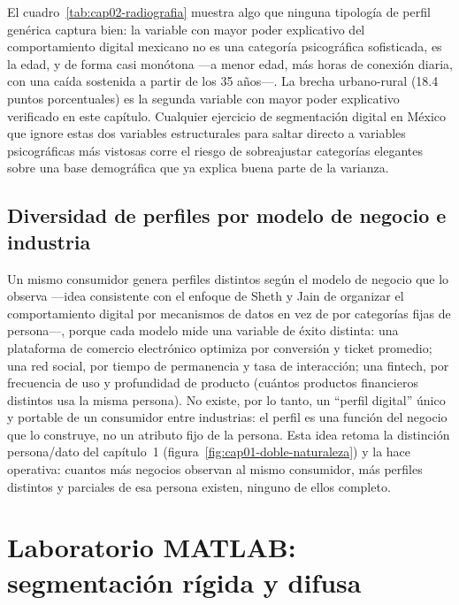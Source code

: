 El cuadro~\ref{tab:cap02-radiografia} muestra algo que ninguna tipología de
perfil genérica captura bien: la variable con mayor poder explicativo del
comportamiento digital mexicano no es una categoría psicográfica sofisticada,
es la edad, y de forma casi monótona —a menor edad, más horas de conexión
diaria, con una caída sostenida a partir de los 35 años—. La brecha
urbano-rural (18.4 puntos porcentuales) es la segunda variable con mayor
poder explicativo verificado en este capítulo. Cualquier ejercicio de
segmentación digital en México que ignore estas dos variables estructurales
para saltar directo a variables psicográficas más vistosas corre el riesgo
de sobreajustar categorías elegantes sobre una base demográfica que ya
explica buena parte de la varianza.

\subsection{Diversidad de perfiles por modelo de negocio e industria}

Un mismo consumidor genera perfiles distintos según el modelo de negocio que
lo observa —idea consistente con el enfoque de Sheth y Jain
\parencite{sheth2026} de organizar el comportamiento digital por mecanismos
de datos en vez de por categorías fijas de persona—, porque cada modelo mide
una variable de éxito distinta: una
plataforma de comercio electrónico optimiza por conversión y ticket
promedio; una red social, por tiempo de permanencia y tasa de interacción;
una fintech, por frecuencia de uso y profundidad de producto (cuántos
productos financieros distintos usa la misma persona). No existe, por lo
tanto, un \enquote{perfil digital} único y portable de un consumidor entre
industrias: el perfil es una función del negocio que lo construye, no un
atributo fijo de la persona. Esta idea retoma la distinción persona/dato del
capítulo~1 (figura~\ref{fig:cap01-doble-naturaleza}) y la hace operativa:
cuantos más negocios observan al mismo consumidor, más perfiles distintos y
parciales de esa persona existen, ninguno de ellos completo.

\section{Laboratorio MATLAB: segmentación rígida y difusa}
\label{sec:cap02-lab}

